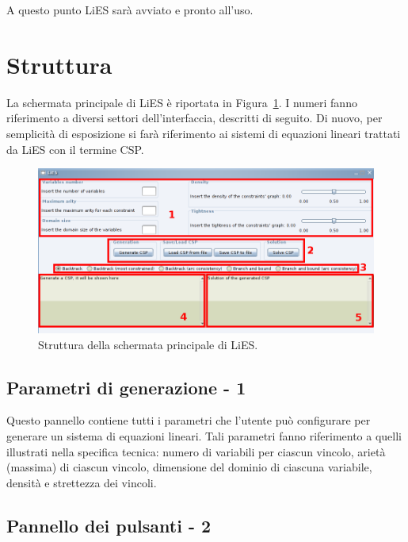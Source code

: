 \documentclass{article}
\begin{document}
A questo punto LiES sarà avviato e pronto all'uso.


\section{Struttura}
\label{sec:struttura}

La schermata principale di LiES è riportata in Figura~\ref{fig:struttura}. I numeri fanno riferimento a diversi settori dell'interfaccia, descritti di seguito. Di nuovo, per semplicità di esposizione si farà riferimento ai sistemi di equazioni lineari trattati da LiES con il termine CSP.

\begin{figure}[htp!]
	\centering
	\includegraphics[scale=.4]{ug-images/structure.png}
	\caption{Struttura della schermata principale di LiES.}
	\label{fig:struttura}
\end{figure}

\subsection{Parametri di generazione - 1} 

Questo pannello contiene tutti i parametri che l'utente può configurare per generare un sistema di equazioni lineari. Tali parametri fanno riferimento a quelli illustrati nella specifica tecnica: numero di variabili per ciascun vincolo, arietà (massima) di ciascun vincolo, dimensione del dominio di ciascuna variabile, densità e strettezza dei vincoli.

\subsection{Pannello dei pulsanti - 2}
\end{document}
